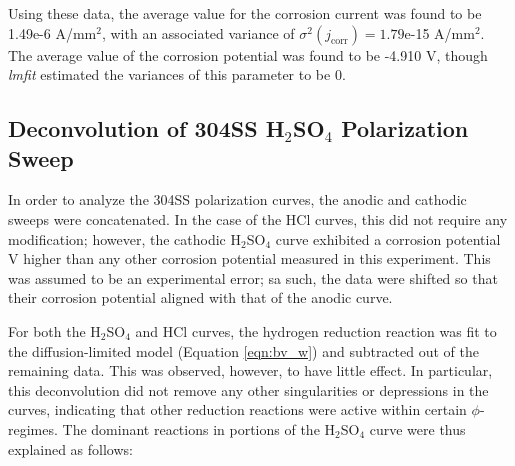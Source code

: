 Using these data, the average value for the corrosion current was found to be 1.49e-6 A/mm$^2$, with an associated variance of $\sigma^2(j_{\text{corr}}) = 1.79$e-15 A/mm$^2$.  The average value of the corrosion potential was found to be -4.910 V, though \textit{lmfit} estimated the variances of this parameter to be 0.

\subsection{Deconvolution of 304SS H$_2$SO$_4$ Polarization Sweep}

In order to analyze the 304SS polarization curves, the anodic and cathodic sweeps were concatenated.  In the case of the HCl curves, this did not require any modification; however, the cathodic H$_2$SO$_4$ curve exhibited a corrosion potential  V higher than any other corrosion potential measured in this experiment.  This was assumed to be an experimental error; sa such, the data were shifted so that their corrosion potential aligned with that of the anodic curve.

For both the H$_2$SO$_4$ and HCl curves, the hydrogen reduction reaction was fit to the diffusion-limited model (Equation \ref{eqn:bv_w}) and subtracted out of the remaining data.  This was observed, however, to have little effect.  In particular, this deconvolution did not remove any other singularities or depressions in the curves, indicating that other reduction reactions were active within certain $\phi$-regimes.  The dominant reactions in portions of the H$_2$SO$_4$ curve were thus explained as follows:

